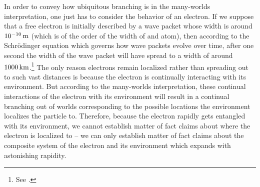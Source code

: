        In order to convey how ubiquitous branching is in the many-worlds interpretation, one just has to consider the behavior of an electron. If we suppose that a free electron \label{electronspread} is initially described by a wave packet whose width is around $\du{e-10}{\m}$  (which is of the order of the width of and atom), then according to the Schr\"{o}dinger equation which governs how wave packets evolve over time, after one second the width of the wave packet will have spread to a width of around $\du{1000}{\km}$.\footnote{See \cite[117]{Schlosshauer}.} The only reason electrons remain localized rather than spreading out to such vast distances is because the electron is continually interacting with its environment.  But according to the many-worlds interpretation, these continual interactions of the electron with its environment will result in a continual branching out of worlds corresponding to the possible locations the environment localizes the particle to. Therefore, because the electron rapidly gets entangled with its environment, we cannot establish matter of fact claims about where the electron is localized to -- we can only establish matter of fact claims about the composite system of the electron and its environment which expands with astonishing rapidity.     
       
